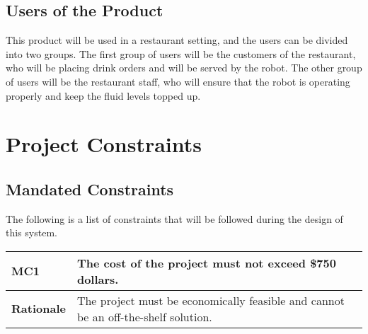 \documentclass [11pt]{article}
\begin{document}
\subsection{Users of the Product} 
This product will be used in a restaurant setting, and the users can be divided into two groups. The first group of users will be the customers of the restaurant, who will be placing drink orders and will be served by the robot. The other group of users will be the restaurant staff, who will ensure that the robot is operating properly and keep the fluid levels topped up.



\section{\textbf{Project Constraints}}

\subsection{Mandated Constraints}
The following is a list of constraints that will be followed during the design of this system.

\begin{longtable}{| p{ } | p{ } | }\hline 
\rowcolor{tableCell}\textbf{MC1} & \textbf{The cost of the project must not exceed \$750 dollars.} \\ \hline
\textbf{Rationale} & The project must be economically feasible and cannot be an off-the-shelf solution.\\ \hline 
\end{longtable}
\end{document}
